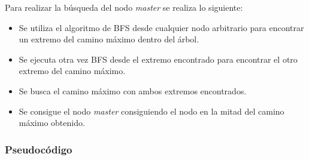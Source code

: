 \documentclass[a4paper, 10pt, twoside]{article}
\begin{document}
Para realizar la búsqueda del nodo \textit{master} se realiza lo siguiente:

\begin{itemize}
\item Se utiliza el algoritmo de BFS desde cualquier nodo arbitrario para encontrar un extremo del camino máximo dentro del árbol.
\item Se ejecuta otra vez BFS desde el extremo encontrado para encontrar el otro extremo del camino máximo.
\item Se busca el camino máximo con ambos extremos encontrados.
\item Se consigue el nodo \textit{master} consiguiendo el nodo en la mitad del camino máximo obtenido.
\end{itemize}

\subsubsection{Pseudocódigo}
\end{document}
